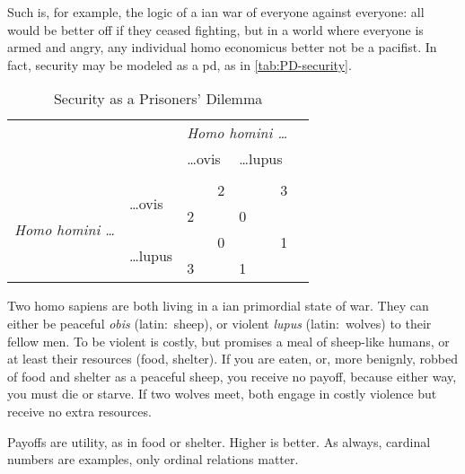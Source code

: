 Such is, for example, the logic of a \citeauthor{Hobbes-1651-aa}ian war of everyone against everyone:
all would be better off if they ceased fighting, but in a world where everyone is armed and angry, any individual homo economicus better not be a pacifist.
In fact, security may be modeled as a \gls{pd}, as in \autoref{tab:PD-security}.

\begin{table}
	\caption{Security as a Prisoners' Dilemma}
	\label{tab:PD-security}
	\begin{center}
	\begin{tabular}
		{m{1cm}
		m{}
		m{}
		m{}
		m{}}

&
& \multicolumn{2}{c}{\emph{Homo homini \ldots}}
\\


&
&\ldots ovis
& \ldots lupus
\\\\ %

\cline{3-4}


\multicolumn{1}{c}{\multirow{4}{*}{\emph{Homo homini \ldots}}}
& \multirow{2}{2,3cm}{\ldots ovis}
& 	\multicolumn{1}{|r|}{2}
& \multicolumn{1}{r|}{3}
\\


\multicolumn{1}{c}{}
& \multicolumn{1}{c}{}
& \multicolumn{1}{|l|}{2}
& \multicolumn{1}{l|}{0}
\\

\cline{3-4}

\multicolumn{1}{c}{}
& \multirow{2}{2,3cm}{\ldots lupus}
& \multicolumn{1}{|r|}{0}
& \multicolumn{1}{r|}{1}
\\


\multicolumn{1}{c}{}
& \multicolumn{1}{c}{}
& \multicolumn{1}{|l|}{3}
& \multicolumn{1}{l|}{1}
\\

\cline{3-4}
\end{tabular}
\end{center}
\scriptsize{
	Two homo sapiens are both living in a \citeauthor{Hobbes-1651-aa}ian primordial state of war.
	They can either be peaceful \emph{obis} (latin:\ sheep), or violent \emph{lupus} (latin:\ wolves) to their fellow men.
	To be violent is costly, but promises a meal of sheep-like humans, or at least their resources (food, shelter).
	If you are eaten, or, more benignly, robbed of food and shelter as a peaceful sheep, you receive no payoff, because either way, you must die or starve.
	If two wolves meet, both engage in costly violence but receive no extra resources.

	Payoffs are utility, as in food or shelter.
	Higher is better.
	As always, cardinal numbers are examples, only ordinal relations matter.}
\end{table}

